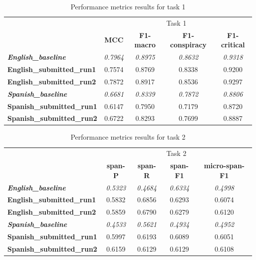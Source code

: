 \documentclass{Configuration_Files/PoliMi3i_thesis}
\begin{document}
\begin{table}[H]
\centering
\begin{tabular}{lcccc}
\hline
        & \multicolumn{4}{c}{Task 1} \\
        & \textbf{MCC}                & \textbf{F1-macro}           & \textbf{F1-conspiracy}     & \textbf{F1-critical} \\
\hline
\textbf{\textit{English\_baseline}}  & \textit{0.7964} & \textit{0.8975} & \textit{0.8632} & \textit{0.9318} \\ 
\textbf{English\_submitted\_run1} & 0.7574 & 0.8769 & 0.8338 & 0.9200 \\ 
\textbf{English\_submitted\_run2} & 0.7872 & 0.8917 & 0.8536 & 0.9297 \\ 
\hline
\textbf{\textit{Spanish\_baseline}}  & \textit{0.6681} & \textit{0.8339} & \textit{0.7872} & \textit{0.8806} \\ 
\textbf{Spanish\_submitted\_run1} & 0.6147 & 0.7950 & 0.7179  & 0.8720 \\ 
\textbf{Spanish\_submitted\_run2} & 0.6722  & 0.8293 & 0.7699 & 0.8887  \\
\hline
\end{tabular}
\caption{Performance metrics results for task 1}
\label{tab:subtask1_results}
\end{table}
\FloatBarrier

\begin{table}[H]
\centering
\begin{tabular}{lcccc}
\hline
& \multicolumn{4}{c}{Task 2} \\
& \textbf{span-P}                & \textbf{span-R}           & \textbf{span-F1}      & \textbf{micro-span-F1}  \\
\hline
\textbf{\textit{English\_baseline}} & \textit{0.5323} & \textit{0.4684} & \textit{0.6334} & \textit{0.4998} \\ 
\textbf{English\_submitted\_run1} & 0.5832 & 0.6856 & 0.6293 & 0.6074 \\ 
\textbf{English\_submitted\_run2} & 0.5859 & 0.6790 & 0.6279 & 0.6120 \\ 
\hline
\textbf{\textit{Spanish\_baseline}}  & \textit{0.4533} & \textit{0.5621} & \textit{0.4934} & \textit{0.4952} \\
\textbf{Spanish\_submitted\_run1} & 0.5997 & 0.6193 & 0.6089  & 0.6051 \\ 
\textbf{Spanish\_submitted\_run2} & 0.6159 & 0.6129 & 0.6129  & 0.6108 \\ 
\hline
\end{tabular}
\caption{Performance metrics results for task 2}
\label{tab:subtask2_results}
\end{table}
\FloatBarrier %
\end{document}
